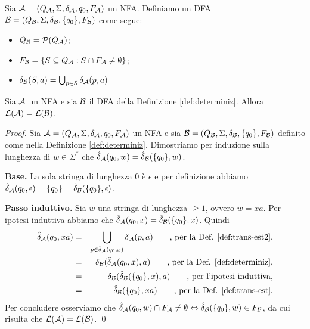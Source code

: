 \documentclass[runningheads,a4paper]{llncs}
\begin{document}
\begin{definition}[Determinizzazione]\label{def:determiniz}
Sia $\mathcal{A} = (Q_{\mathcal{A}},\Sigma,\delta_{\mathcal{A}},q_0,F_{\mathcal{A}})$ un NFA. Definiamo un DFA $\mathcal{B} = (Q_{\mathcal{B}},\Sigma,\delta_{\mathcal{B}},\{q_0\},F_{\mathcal{B}})$ come segue:
\begin{itemize}
\item $Q_{\mathcal{B}} = \mathcal{P}(Q_{\mathcal{A}})$;
\item $F_{\mathcal{B}} = \{S \subseteq Q_{\mathcal{A}} : S \cap F_{\mathcal{A}} \neq \emptyset\}$;
\item $\delta_{\mathcal{B}}(S,a) = \bigcup_{p \in S} \delta_{\mathcal{A}}(p,a)$
\end{itemize}
\end{definition}

\begin{theorem}[Equivalenza]\label{thm:det-non-det}
Sia $\mathcal{A}$ un NFA e sia $\mathcal{B}$ il DFA della Definizione \ref{def:determiniz}. Allora $\mathcal{L}(\mathcal{A}) = \mathcal{L}(\mathcal{B})$.
\end{theorem}

\begin{proof}
Sia $\mathcal{A} = (Q_{\mathcal{A}},\Sigma,\delta_{\mathcal{A}},q_0,F_{\mathcal{A}})$ un NFA e sia $\mathcal{B} = (Q_{\mathcal{B}},\Sigma,\delta_{\mathcal{B}},\{q_0\},F_{\mathcal{B}})$ definito come nella Definizione \ref{def:determiniz}. Dimostriamo per induzione sulla lunghezza di $w \in \Sigma^*$ che $\hat{\delta}_{\mathcal{A}}(q_0,w)= \hat{\delta}_{\mathcal{B}}(\{q_0\},w)$.

\noindent\textbf{Base.} La sola stringa di lunghezza $0$ \`{e} $\epsilon$ e per definizione abbiamo $\hat{\delta}_{\mathcal{A}}(q_0,\epsilon) = \{q_0\} = \hat{\delta}_{\mathcal{B}}(\{q_0\},\epsilon)$.

\noindent\textbf{Passo induttivo.} Sia $w$ una stringa di lunghezza $\geq 1$, ovvero $w = xa$. Per ipotesi induttiva abbiamo che $\hat{\delta}_{\mathcal{A}}(q_0,x) = \hat{\delta}_{\mathcal{B}}(\{q_0\},x)$. Quindi
\begin{eqnarray*}
\hat{\delta}_{\mathcal{A}}(q_0,xa) & = & \bigcup_{p \in \hat{\delta}_{\mathcal{A}}(q_0,x)} \delta_{\mathcal{A}}(p,a) \qquad \mbox{, per la Def. \ref{def:trans-est2}.} \\
 & = & \delta_{\mathcal{B}}(\hat{\delta}_{\mathcal{A}}(q_0,x),a) \qquad \mbox{, per la Def. \ref{def:determiniz},}\\
 & = & \delta_{\mathcal{B}}(\hat{\delta}_{\mathcal{B}}(\{q_0\},x),a) \qquad \mbox{, per l'ipotesi induttiva,} \\
 & = & \hat{\delta}_{\mathcal{B}}(\{q_0\},xa) \qquad \mbox{, per la Def. \ref{def:trans-est}.}
\end{eqnarray*}
Per concludere osserviamo che $\hat{\delta}_{\mathcal{A}}(q_0,w) \cap F_{\mathcal{A}} \neq \emptyset \Leftrightarrow \hat{\delta}_{\mathcal{B}}(\{q_0\},w) \in F_{\mathcal{B}}$, da cui risulta che $\mathcal{L}(\mathcal{A}) = \mathcal{L}(\mathcal{B})$.
\qed\end{proof}
\end{document}
